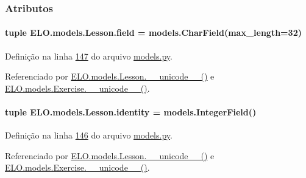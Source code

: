 \subsubsection{Atributos}
\hypertarget{classELO_1_1models_1_1Lesson_a1657c9c36e8d9c58d86c272e2339e7b1}{}
\paragraph[{field}]{\setlength{\rightskip}{0pt plus 5cm}tuple E\+L\+O.\+models.\+Lesson.\+field = models.\+Char\+Field(max\+\_\+length=32)\hspace{0.3cm}{\ttfamily [static]}}\label{classELO_1_1models_1_1Lesson_a1657c9c36e8d9c58d86c272e2339e7b1}


Definição na linha \hyperlink{ELO_2models_8py_source_l00147}{147} do arquivo \hyperlink{ELO_2models_8py_source}{models.\+py}.



Referenciado por \hyperlink{classELO_1_1models_1_1Lesson_a53e265de97c6b73f262f62a80f9ca994}{E\+L\+O.\+models.\+Lesson.\+\_\+\+\_\+unicode\+\_\+\+\_\+()} e \hyperlink{classELO_1_1models_1_1Exercise_a23f81c66e4d6bc5a4582d74d191f5117}{E\+L\+O.\+models.\+Exercise.\+\_\+\+\_\+unicode\+\_\+\+\_\+()}.

\hypertarget{classELO_1_1models_1_1Lesson_aa650c6add387eee9e15421717074c0d3}{}
\paragraph[{identity}]{\setlength{\rightskip}{0pt plus 5cm}tuple E\+L\+O.\+models.\+Lesson.\+identity = models.\+Integer\+Field()\hspace{0.3cm}{\ttfamily [static]}}\label{classELO_1_1models_1_1Lesson_aa650c6add387eee9e15421717074c0d3}


Definição na linha \hyperlink{ELO_2models_8py_source_l00146}{146} do arquivo \hyperlink{ELO_2models_8py_source}{models.\+py}.



Referenciado por \hyperlink{classELO_1_1models_1_1Lesson_a53e265de97c6b73f262f62a80f9ca994}{E\+L\+O.\+models.\+Lesson.\+\_\+\+\_\+unicode\+\_\+\+\_\+()} e \hyperlink{classELO_1_1models_1_1Exercise_a23f81c66e4d6bc5a4582d74d191f5117}{E\+L\+O.\+models.\+Exercise.\+\_\+\+\_\+unicode\+\_\+\+\_\+()}.

